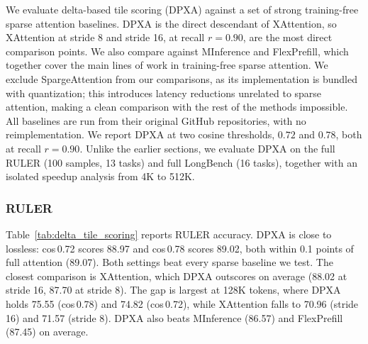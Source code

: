 We evaluate delta-based tile scoring (DPXA) against a set of strong training-free sparse attention baselines. DPXA is the direct descendant of XAttention, so XAttention at stride 8 and stride 16, at recall $r{=}0.90$, are the most direct comparison points. We also compare against MInference and FlexPrefill, which together cover the main lines of work in training-free sparse attention. We exclude SpargeAttention from our comparisons, as its implementation is bundled with quantization; this introduces latency reductions unrelated to sparse attention, making a clean comparison with the rest of the methods impossible. All baselines are run from their original GitHub repositories, with no reimplementation. We report DPXA at two cosine thresholds, $0.72$ and $0.78$, both at recall $r{=}0.90$. Unlike the earlier sections, we evaluate DPXA on the full RULER (100 samples, 13 tasks) and full LongBench (16 tasks), together with an isolated speedup analysis from 4K to 512K.


\subsubsection{RULER}

Table~\ref{tab:delta_tile_scoring} reports RULER accuracy. DPXA is close to lossless: cos\,0.72 scores 88.97 and cos\,0.78 scores 89.02, both within 0.1 points of full attention (89.07). Both settings beat every sparse baseline we test. The closest comparison is XAttention, which DPXA outscores on average (88.02 at stride 16, 87.70 at stride 8). The gap is largest at 128K tokens, where DPXA holds 75.55 (cos\,0.78) and 74.82 (cos\,0.72), while XAttention falls to 70.96 (stride 16) and 71.57 (stride 8). DPXA also beats MInference (86.57) and FlexPrefill (87.45) on average.

